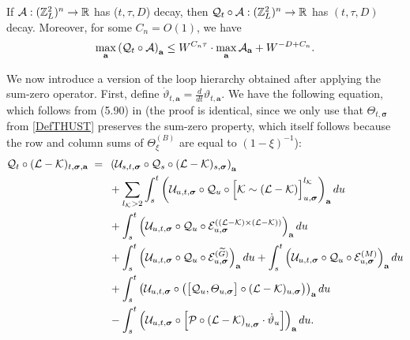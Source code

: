 \begin{lemma}\label{lem_+Q} 
If ${\cal A}:(\mathbb{Z}_{L}^{2})^{n}\to\mathbb{R}$ has ($t, \tau, D$) decay, then ${\cal Q}_{t}\circ{\cal A}:(\mathbb{Z}_{L}^{2})^{n}\to\mathbb{R}$ has $(t,\tau,D)$ decay. Moreover, for some $C_{n}=O(1)$, we have  
\begin{align}\label{normQA}
        \max_{\textbf{a}} \left({\cal Q}_t\circ \cal A\right)_{\textbf{a}} \le W^{C_n \tau} \cdot \max_{\textbf{a}} {\cal A}_{\textbf{a}}+W^{-D+C_n}.
\end{align}
\end{lemma}
We now introduce a version of the loop hierarchy obtained after applying the sum-zero operator. First, define $\dot{\vartheta}_{t,\textbf{a}}=\frac{d}{dt}\vartheta_{t,\textbf{a}}$. We have the following equation, which follows from (5.90) in \cite{YY_25} (the proof is identical, since we only use that $\varTheta_{t, \boldsymbol{\sigma}}$  from \eqref{DefTHUST}  preserves the sum-zero property, which itself follows because the row and column sums of $\Theta^{(B)}_{\xi}$ are equal to $(1-\xi)^{-1}$):
 \begin{align}\label{int_K-L+Q}
  {\cal Q}_t\circ   (\mathcal{L} - \mathcal{K})_{t, \boldsymbol{\sigma}, \textbf{a}} \;=\; \; &
    \left(\mathcal{U}_{s, t, \boldsymbol{\sigma}} \circ  {\cal Q}_s\circ (\mathcal{L} - \mathcal{K})_{s, \boldsymbol{\sigma}}\right)_{\textbf{a}} \nonumber \\
    &+ \sum_{l_\mathcal{K} > 2} \int_{s}^t \left(\mathcal{U}_{u, t, \boldsymbol{\sigma}} \circ  {\cal Q}_u\circ \Big[\mathcal{K} \sim (\mathcal{L} - \mathcal{K})\Big]^{l_\mathcal{K}}_{u, \boldsymbol{\sigma}}\right)_{\textbf{a}} du \nonumber \\
    &+ \int_{s}^t \left(\mathcal{U}_{u, t, \boldsymbol{\sigma}} \circ  {\cal Q}_u\circ \mathcal{E}^{((\mathcal{L} - \mathcal{K}) \times (\mathcal{L} - \mathcal{K}))}_{u, \boldsymbol{\sigma}}\right)_{\textbf{a}} du \nonumber \\
    &+ \int_{s}^t \left(\mathcal{U}_{u, t, \boldsymbol{\sigma}} \circ  {\cal Q}_u\circ \mathcal{E}^{(\widetilde{G})}_{u, \boldsymbol{\sigma}}\right)_{\textbf{a}} du + \int_{s}^t \left(\mathcal{U}_{u, t, \boldsymbol{\sigma}} \circ  {\cal Q}_u\circ \mathcal{E}^{(M)}_{u, \boldsymbol{\sigma}}\right)_{\textbf{a}} du
    \nonumber \\
     &+ \int_{s}^t 
     \left(\mathcal{U}_{u, t, \boldsymbol{\sigma}} 
     \circ \left( \big[{\cal Q}_u , \varTheta_{u,\boldsymbol{\sigma}} \big]\circ (\mathcal{L} - \mathcal{K}) _{u, \boldsymbol{\sigma} }\right) \right)_{\textbf{a}} du
        \\\nonumber
    &- \int_{s}^t 
     \left(\mathcal{U}_{u, t, \boldsymbol{\sigma}} 
     \circ \left[ {\cal P} \circ
      \left(\mathcal{L} - \mathcal{K}\right)_{u, \boldsymbol{\sigma}}
        \cdot \dot \vartheta_{u } \right]\right)_{\textbf{a}} du.
\end{align}
